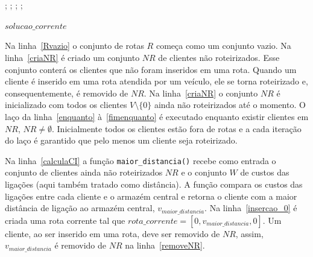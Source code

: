 \begin{algorithm}[ht]
\caption{Algoritmo Savings de Clarke and Wright Paralelo} \label{alg:saving}
\begin{algorithmic}[1]
 \\
 \\
        ; \label{calculasaving}
	    ; \label{ordenasaving}
	    ; \label{solucaocorrente} 
	     \label{loopsaving}
	         \label{restricaoum}
	             \label{restricaodois}
	                ; \label{mesclarrotas}
	            \ENDIF \label{fimrestricaodois}
	        \ENDIF \label{fimrestricaoum}
	    \ENDFOR \label{fimloopsaving}
	    
	    \RETURN $solucao\_corrente$ \label{fimparalelo}
     	
\end{algorithmic}
\end{algorithm}

Na linha~\ref{Rvazio} o conjunto de rotas $R$ começa como um conjunto vazio. Na linha~\ref{criaNR} é criado um conjunto $NR$ de clientes não roteirizados. Esse conjunto conterá os clientes que não foram inseridos em uma rota. Quando um cliente é inserido em uma rota atendida por um veículo, ele se torna roteirizado e, consequentemente, é removido de $NR$. Na linha~\ref{criaNR} o conjunto $NR$ é inicializado com todos os clientes $V\setminus\{0\}$ ainda não roteirizados até o momento. O laço da linha~\ref{enquanto} à~\ref{fimenquanto} é executado enquanto existir clientes em $NR$, $NR \ne \emptyset$. Inicialmente todos os clientes estão fora de rotas e a cada iteração do laço é garantido que pelo menos um cliente seja roteirizado. %

Na linha~\ref{calculaCI} a função \texttt{maior\_distancia()} recebe como entrada o conjunto de clientes ainda não roteirizados $NR$ e o conjunto $W$ de custos das ligações (aqui também tratado como distância). A função compara os custos das ligações entre cada cliente e o armazém central e retorna o cliente com a maior distância de ligação ao armazém central, $v_{maior\_distancia}$. Na linha~\ref{insercao_0} é criada uma rota corrente tal que $rota\_corrente = [0, v_{maior\_distancia},0]$. Um cliente, ao ser inserido em uma rota, deve ser removido de $NR$, assim, $v_{maior\_distancia}$ é removido de $NR$ na linha~\ref{removeNR}.


